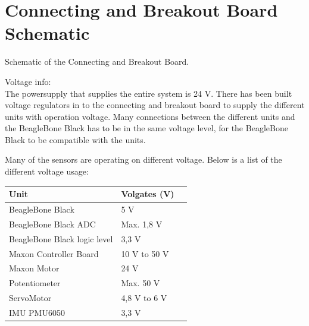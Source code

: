 \chapter{Connecting and Breakout Board Schematic}\label{app:ConnectingBreakoutBoard} 

Schematic of the Connecting and Breakout Board.

Voltage info:\\
The powersupply that supplies the entire system is 24 V. There has been built voltage regulators in to the connecting and breakout board to supply the different units with operation voltage. Many connections between the different units and the BeagleBone Black has to be in the same voltage level, for the BeagleBone Black to be compatible with the units.

Many of the sensors are operating on different voltage. Below is a list of the different voltage usage:
\begin{table}[H]
	\begin{tabular}{|l|l|p{4.3cm}|}
		\hline%
		\textbf{Unit}       &  \textbf{Volgates (V)}         \\
		\hline%
		BeagleBone Black                               & 5 V           \\
		\hline%
		BeagleBone Black ADC							  & Max. 1,8 V              \\
		\hline%
		BeagleBone Black logic level							  & 3,3 V              \\
		\hline%
		Maxon Controller Board 							  & 10 V to 50 V              \\
		\hline%
		Maxon Motor							  & 24 V             \\
		\hline%
		Potentiometer							  & Max. 50 V              \\
		\hline%
		ServoMotor							  & 4,8 V to 6 V              \\
		\hline%
		IMU PMU6050							  & 3,3 V              \\
		\hline%
	\end{tabular}
\end{table}


